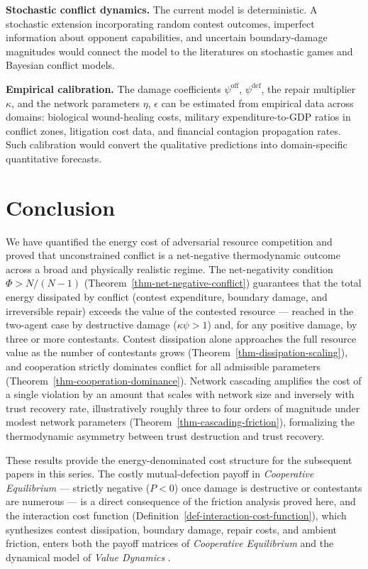 \documentclass[11pt]{article}
\theoremstyle{plain}
\theoremstyle{definition}
\theoremstyle{remark}
\let\origsection\section
\renewcommand{\section}{\needspace{12\baselineskip}\origsection}
\begin{document}
\textbf{Stochastic conflict dynamics.} The current model is
deterministic. A stochastic extension incorporating random contest
outcomes, imperfect information about opponent capabilities, and
uncertain boundary-damage magnitudes would connect the model to the
literatures on stochastic games and Bayesian conflict models.

\textbf{Empirical calibration.} The damage coefficients
\(\psi^{\text{off}}\), \(\psi^{\text{def}}\), the repair multiplier
\(\kappa\), and the network parameters \(\eta\), \(\epsilon\) can be
estimated from empirical data across domains: biological wound-healing
costs, military expenditure-to-GDP ratios in conflict zones, litigation
cost data, and financial contagion propagation rates. Such calibration
would convert the qualitative predictions into domain-specific
quantitative forecasts.

\section{Conclusion}\label{conclusion}

We have quantified the energy cost of adversarial resource competition
and proved that unconstrained conflict is a net-negative thermodynamic
outcome across a broad and physically realistic regime. The
net-negativity condition \(\Phi > N/(N-1)\)
(Theorem~\ref{thm-net-negative-conflict}) guarantees that the total
energy dissipated by conflict (contest expenditure, boundary damage, and
irreversible repair) exceeds the value of the contested resource ---
reached in the two-agent case by destructive damage (\(\kappa\psi > 1\))
and, for any positive damage, by three or more contestants. Contest
dissipation alone approaches the full resource value as the number of
contestants grows (Theorem~\ref{thm-dissipation-scaling}), and
cooperation strictly dominates conflict for all admissible parameters
(Theorem~\ref{thm-cooperation-dominance}). Network cascading amplifies
the cost of a single violation by an amount that scales with network
size and inversely with trust recovery rate, illustratively roughly
three to four orders of magnitude under modest network parameters
(Theorem~\ref{thm-cascading-friction}), formalizing the thermodynamic
asymmetry between trust destruction and trust recovery.

These results provide the energy-denominated cost structure for the
subsequent papers in this series. The costly mutual-defection payoff in
\emph{Cooperative Equilibrium} \citep{TC-V} --- strictly negative
(\(P < 0\)) once damage is destructive or contestants are numerous ---
is a direct consequence of the friction analysis proved here, and the
interaction cost function
(Definition~\ref{def-interaction-cost-function}), which synthesizes
contest dissipation, boundary damage, repair costs, and ambient
friction, enters both the payoff matrices of \emph{Cooperative
Equilibrium} and the dynamical model of \emph{Value Dynamics}
\citep{TC-VI}.
\end{document}
